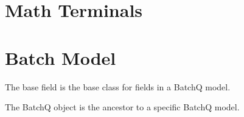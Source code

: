 \documentclass[letterpaper,10pt,english]{sphinxmanual}
\begin{document}
\begin{fulllineitems}

\begin{fulllineitems}
\label{api/shell_terminals:batchq.pipelines.shell.utils.FileTransferTerminal.pwd}
\end{fulllineitems}


\begin{fulllineitems}
\label{api/shell_terminals:batchq.pipelines.shell.utils.FileTransferTerminal.sendfile}
\end{fulllineitems}


\end{fulllineitems}



\section{Math Terminals}
\label{api/math_terminals:math-terminals}\label{api/math_terminals::doc}

\section{Batch Model}
\label{api/batch::doc}\label{api/batch:module-batchq.core.batch}\label{api/batch:batch-model}

\begin{fulllineitems}
\label{api/batch:batchq.core.batch.BaseField}
The base field is the base class for fields in a BatchQ model.

\end{fulllineitems}


\begin{fulllineitems}
\label{api/batch:batchq.core.batch.BatchQ}
The BatchQ object is the ancestor to a specific BatchQ model.

\end{fulllineitems}
\end{document}
